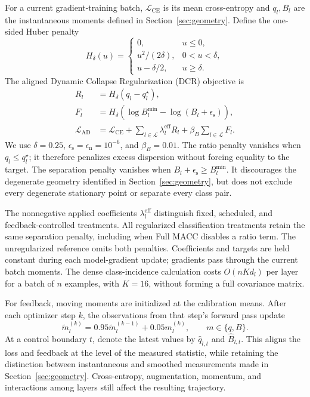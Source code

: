 \documentclass[10pt,a4paper,twocolumn]{article}
\newcommand{\CE}{\mathcal{L}_{\mathrm{CE}}}
\newcommand{\AD}{\mathrm{AD}}
\newcommand{\epss}{\epsilon_{\mathrm{s}}}
\newcommand{\epsn}{\epsilon_{\mathrm{n}}}
\begin{document}
For a current gradient-training batch, $\CE$ is its mean cross-entropy
and $q_l,B_l$ are the instantaneous moments defined in
Section~\ref{sec:geometry}. Define the one-sided Huber penalty
\begin{equation}
 H_\delta(u)=
 \begin{cases}
 0,&u\le0,\\
 u^2/(2\delta),&0<u<\delta,\\
 u-\delta/2,&u\ge\delta.
 \end{cases}
 \label{eq:huber}
\end{equation}
The aligned Dynamic Collapse Regularization (DCR) objective is
\begin{align}
 R_l&=H_\delta(q_l-q_l^\star),\\
 F_l&=H_\delta\!\left(
       \log B_l^{\min}-\log(B_l+\epss)\right),\\
 \mathcal L_{\AD}
 &=\CE+\sum_{l\in\mathcal L}\lambda_l^{\mathrm{eff}}R_l
       +\beta_B\sum_{l\in\mathcal L}F_l.
 \label{eq:aligned_loss}
\end{align}
We use $\delta=0.25$, $\epss=\epsn=10^{-6}$, and $\beta_B=0.01$.
The ratio penalty vanishes when $q_l\le q_l^\star$; it therefore
penalizes excess dispersion without forcing equality to the target.
The separation penalty vanishes when $B_l+\epss\ge B_l^{\min}$.
It discourages the degenerate geometry identified in Section~\ref{sec:geometry},
but does not exclude every degenerate stationary point or separate
every class pair.

The nonnegative applied coefficients $\lambda_l^{\mathrm{eff}}$ distinguish
fixed, scheduled, and feedback-controlled treatments. All regularized
classification treatments retain the same separation penalty, including
when Full MACC disables a ratio term. The unregularized reference omits
both penalties. Coefficients and targets are held constant during each
model-gradient update; gradients pass through the current batch moments.
The dense class-incidence calculation costs $O(nKd_l)$ per layer for
a batch of $n$ examples, with $K=16$, without forming a full covariance
matrix.

For feedback, moving moments are initialized at the calibration means.
After each optimizer step $k$, the observations from that step's forward
pass update
\[
 \widetilde m_l^{(k)}=0.95\widetilde m_l^{(k-1)}+0.05m_l^{(k)},
 \qquad m\in\{q,B\}.
\]
At a control boundary $t$, denote the latest values by
$\widehat q_{l,t}$ and $\widehat B_{l,t}$. This aligns the loss and
feedback at the level of the measured statistic, while retaining the
distinction between instantaneous and smoothed measurements made in
Section~\ref{sec:geometry}. Cross-entropy, augmentation, momentum,
and interactions among layers still affect the resulting trajectory.
\end{document}
